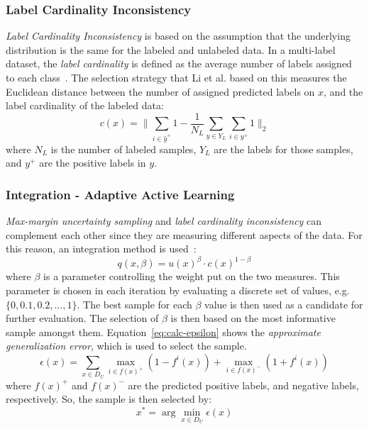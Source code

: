 \subsubsection{Label Cardinality Inconsistency}

\textit{Label Cardinality Inconsistency} is based on the assumption that the underlying distribution is the same for the labeled and unlabeled data.
In a multi-label dataset, the \textit{label cardinality} is defined as the average number of labels assigned to each class~\cite{tsoumakas2006multi}.
The selection strategy that Li et al\@. based on this measures the Euclidean distance between the number of assigned predicted labels on $x$, and the label cardinality of the labeled data:
\begin{equation}
    c(x) = \bigg \lVert \sum_{i \in \hat{y}^+} 1 - \frac{1}{N_L} \sum_{y \in Y_L} \sum_{i \in y^+} 1 \bigg \rVert_2
\end{equation}
where $N_L$ is the number of labeled samples, $Y_L$ are the labels for those samples, and $y^+$ are the positive labels in $y$.

\subsubsection{Integration - Adaptive Active Learning}

\textit{Max-margin uncertainty sampling} and \textit{label cardinality inconsistency} can complement each other since they are measuring different aspects of the data. 
For this reason, an integration method is used~\cite{li2013active}:
\begin{equation}\label{eq:approx-generalization-error}
    q(x, \beta) = u(x)^\beta \cdot c(x)^{1-\beta}
\end{equation}
where $\beta$ is a parameter controlling the weight put on the two measures.
This parameter is chosen in each iteration by evaluating a discrete set of values, e.g. $\{0, 0.1, 0.2, \dots, 1\}$.
The best sample for each $\beta$ value is then used as a candidate for further evaluation.
The selection of $\beta$ is then based on the most informative sample amongst them.
Equation~\ref{eq:calc-epsilon} shows the \textit{approximate generalization error}, which is used to select the sample.
\begin{equation}\label{eq:calc-epsilon}
    \epsilon(x) = \sum_{x \in D_U} \max_{i \in f(x)^+}(1-f^i(x)) + \max_{i \in f(x)^-}(1+f^i(x))
\end{equation}
where $f(x)^+$ and $f(x)^-$ are the predicted positive labels, and negative labels, respectively.
So, the sample is then selected by:
\begin{equation}\label{eq:x-star}
    x^* = \arg \min_{x \in D_U} \epsilon(x)
\end{equation}

